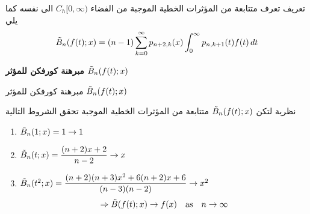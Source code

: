 \begin{frame}
	\begin{exampleblock}{تعريف}
		تعرف متتابعة من المؤثرات الخطية الموجبة من الفضاء $C_h[0, \infty)$ الى نفسه كما يلي
		\[
		\tilde{B}_n(f(t); x) = (n-1)\sum_{k=0}^{\infty} p_{n+2, k}(x) \int_{0}^{\infty} p_{n, k+1}(t) f(t) \, dt
		\]
	\end{exampleblock}
\end{frame}

\begin{frame}
	\begin{center}
		\Huge\textbf{مبرهنة كورفكن للمؤثر $\tilde{B}_n(f(t); x)$}
	\end{center}
\end{frame}

\begin{frame}{مبرهنة كورفكن للمؤثر $\tilde{B}_n(f(t); x)$}
	\begin{exampleblock}{نظرية}
		لتكن $\tilde{B}_n(f(t); x)$ متتابعة من المؤثرات الخطية الموجبة  تحقق الشروط التالية
		\begin{english}
			\begin{enumerate}
				\item $\tilde{B}_n(1; x) = 1\to 1$
				\item $\tilde{B}_n(t; x) = \dfrac{(n+2)x+2}{n-2}\to x$
				\item $\tilde{B}_n(t^2; x) = \dfrac{(n+2)(n+3)x^2 + 6(n+2)x + 6}{(n-3)(n-2)}\to x^2$
				\[
				\Rightarrow \tilde{B}(f(t); x) \to f(x)\quad \text{as}\quad n \to \infty
				\]
			\end{enumerate}
		\end{english}
	\end{exampleblock}
\end{frame}
